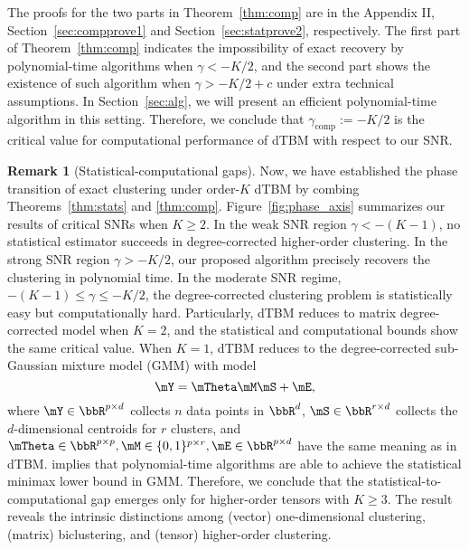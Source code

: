 \documentclass[lettersize,onecolumn,journal]{IEEEtran}
\theoremstyle{definition}
\theoremstyle{definition}
\newtheorem{rmk}{Remark}
\begin{document}
{
  
The proofs for the two parts in Theorem~\ref{thm:comp} are in the Appendix II, Section~\ref{sec:compprove1} and Section~\ref{sec:statprove2}, respectively. The first part of Theorem~\ref{thm:comp} indicates the impossibility of exact recovery by polynomial-time algorithms when $\gamma < -K/2$, and the second part shows the existence of such algorithm when $\gamma > -K/2+c$ under extra technical assumptions. In Section~\ref{sec:alg}, we will present an efficient polynomial-time algorithm in this setting. Therefore, we conclude that $\gamma_{\text{comp}}:=-K/2$ is the critical value for computational performance of dTBM with respect to our SNR. 

}


\begin{rmk}[Statistical-computational gaps]
Now, we have established the phase transition of exact clustering under order-$K$ dTBM by combing Theorems~\ref{thm:stats} and \ref{thm:comp}. Figure~\ref{fig:phase_axis} summarizes our results of critical SNRs when $K \geq 2$. In the weak SNR region $\gamma < -(K-1)$, no statistical estimator succeeds in degree-corrected higher-order clustering. In the strong SNR region $\gamma  > -K/2$, our proposed algorithm precisely recovers the clustering in polynomial time. In the moderate SNR regime, $-(K-1)\leq \gamma \leq -K/2$, the degree-corrected clustering problem is statistically easy but computationally hard. Particularly, dTBM reduces to matrix degree-corrected model when $K =2$, and the statistical and computational bounds show the same critical value. When $K =1$, dTBM reduces to the degree-corrected sub-Gaussian mixture model (GMM) with model
\begin{equation}
    \mY = \mTheta \mM \mS + \mE,
\end{equation}
where $\mY \in \bbR^{p \times d}$ collects $n$ data points in $\bbR^d$, $\mS \in \bbR^{r \times d}$ collects the $d$-dimensional centroids for $r$ clusters, and $\mTheta \in \bbR^{p \times p}, \mM \in \{0,1\}^{p \times r}, \mE \in \bbR^{p \times d}$ have the same meaning as in dTBM. \cite{lu2016statistical} implies that polynomial-time algorithms are able to achieve the statistical minimax lower bound in GMM. Therefore, we conclude that the statistical-to-computational gap emerges only for higher-order tensors with $K \geq 3$. The result reveals the intrinsic distinctions among (vector) one-dimensional clustering, (matrix) biclustering, and (tensor) higher-order clustering. 
\end{rmk}
\end{document}
